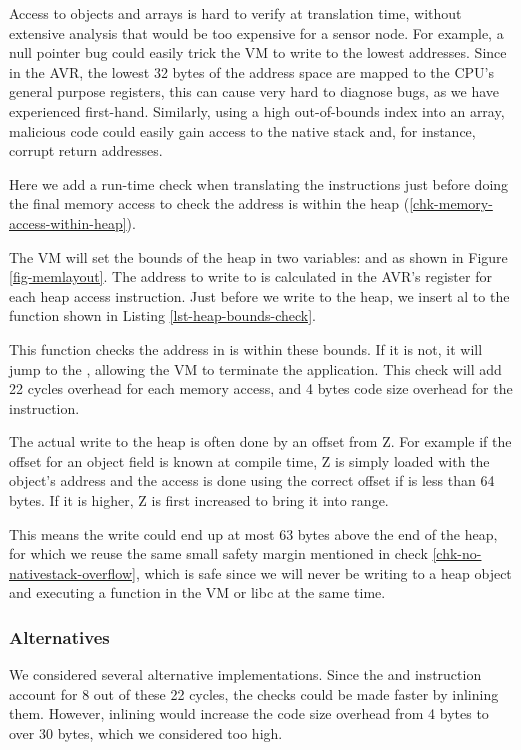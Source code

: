 Access to objects and arrays is hard to verify at translation time, without extensive analysis that would be too expensive for a sensor node. For example, a null pointer bug could easily trick the VM to write to the lowest addresses. Since in the AVR, the lowest 32 bytes of the address space are mapped to the CPU's general purpose registers, this can cause very hard to diagnose bugs, as we have experienced first-hand. Similarly, using a high out-of-bounds index into an array, malicious code could easily gain access to the native stack and, for instance, corrupt return addresses.

Here we add a run-time check when translating the instructions just before doing the final memory access to check the address is within the heap (\ref{chk-memory-access-within-heap}).

The VM will set the bounds of the heap in two variables:  and  as shown in Figure \ref{fig-memlayout}. The address to write to is calculated in the AVR's  register for each heap access instruction. Just before we write to the heap, we insert al  to the  function shown in Listing \ref{lst-heap-bounds-check}.

This function checks the address in  is within these bounds. If it is not, it will jump to the , allowing the VM to terminate the application. This check will add 22 cycles overhead for each memory access, and 4 bytes code size overhead for the  instruction.

The actual write to the heap is often done by an offset from Z. For example if the offset for an object field is known at compile time, Z is simply loaded with the object's address and the access is done using the correct offset if is less than 64 bytes. If it is higher, Z is first increased to bring it into range.

This means the write could end up at most 63 bytes above the end of the heap, for which we reuse the same small safety margin mentioned in check \ref{chk-no-nativestack-overflow}, which is safe since we will never be writing to a heap object and executing a function in the VM or libc at the same time.

\subsubsection{Alternatives}
We considered several alternative implementations. Since the  and  instruction account for 8 out of these 22 cycles, the checks could be made faster by inlining them. However, inlining would increase the code size overhead from 4 bytes to over 30 bytes, which we considered too high.

